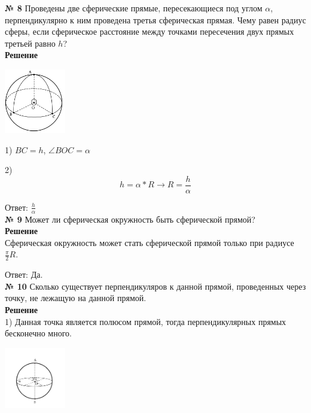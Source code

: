     \textbf{№ 8}
    Проведены две сферические прямые, пересекающиеся под углом $\alpha$,
    перпендикулярно к ним проведена третья сферическая прямая.
    Чему равен радиус сферы, если сферическое расстояние между точками пересечения
    двух прямых третьей равно $h$?\\

    \textbf{Решение}\\

    \begin{center}
        \includegraphics[width=0.2\textwidth]{images/img14}\\
    \end{center}

    1) $BC = h$, $\angle BOC = \alpha$

    2) \[
           h  = \alpha * R \rightarrow R = \frac{h}{\alpha}

    \]

    Ответ: $\frac{h}{\alpha}$\\

    \textbf{№ 9}
    Может ли сферическая окружность быть сферической прямой?\\

    \textbf{Решение}\\

    Сферическая окружность может стать сферической прямой только при радиусе $\frac{\pi}{2}R$.

    Ответ: Да.\\

    \textbf{№ 10}
    Сколько существует перпендикуляров к данной прямой, проведенных через точку,
    не лежащую на данной прямой.\\

    \textbf{Решение}\\

    1) Данная точка является полюсом прямой, тогда перпендикулярных прямых бесконечно много.
    \begin{center}
        \includegraphics[width=0.2\textwidth]{images/img15}\\
    \end{center}

